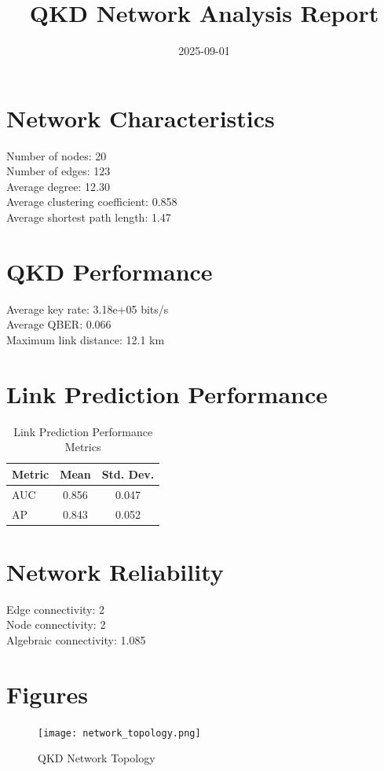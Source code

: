 \documentclass{article}
\title{QKD Network Analysis Report}
\date{2025-09-01}
\begin{document}
    \maketitle

    \section{Network Characteristics}
    Number of nodes: 20 \\
    Number of edges: 123 \\
    Average degree: 12.30 \\
    Average clustering coefficient: 0.858 \\
    Average shortest path length: 1.47

    \section{QKD Performance}
    Average key rate: 3.18e+05 bits/s \\
    Average QBER: 0.066 \\
    Maximum link distance: 12.1 km

    \section{Link Prediction Performance}
    \begin{table}[H]
    \centering
    \begin{tabular}{lcc}
    \toprule
    Metric & Mean & Std. Dev. \\
    \midrule
    AUC & 0.856 &
        0.047 \\
    AP & 0.843 &
        0.052 \\
    \bottomrule
    \end{tabular}
    \caption{Link Prediction Performance Metrics}
    \end{table}

    \section{Network Reliability}
    Edge connectivity: 2 \\
    Node connectivity: 2 \\
    Algebraic connectivity: 1.085

    \section{Figures}
    \begin{figure}[H]
    \centering
    \texttt{[image: network\_topology.png]}
    \caption{QKD Network Topology}
    \end{figure}
\end{document}
